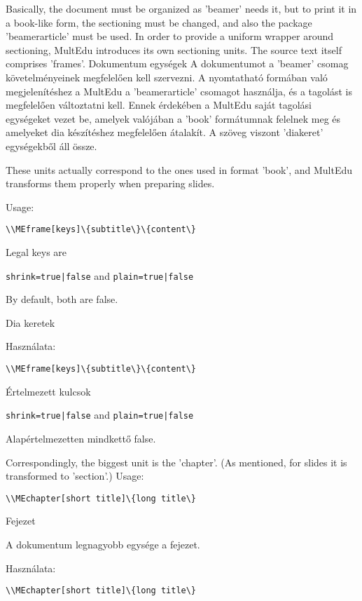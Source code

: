 



{
Basically, the document must be organized as 'beamer' needs it,
but to print it in a book-like form, the sectioning must be changed,
and also the package 'beamerarticle' must be used.
In order to provide a uniform wrapper around sectioning, \gls{MultEdu} introduces
its own sectioning units. The source text itself comprises 'frames'.
}
{Dokumentum egységek}
{
A dokumentumot a 'beamer' csomag követelményeinek megfelelően kell szervezni.
A nyomtatható formában való megjelenítéshez a \gls{MultEdu}  a 'beamerarticle' csomagot használja,
és a tagolást is megfelelően változtatni kell.
Ennek érdekében a \gls{MultEdu} saját tagolási egységeket vezet be, amelyek valójában
a 'book' formátumnak felelnek meg és amelyeket dia készítéshez megfelelően átalakít. A szöveg viszont 'diakeret' egységekből áll össze.
}

{
These units actually correspond to the ones used in format 'book',
and \gls{MultEdu} transforms them properly when preparing slides.

Usage:\par
\noindent\lstinline|\\MEframe[keys]\{subtitle\}\{content\}|

Legal keys are 

\noindent\lstinline!shrink=true|false! and \lstinline!plain=true|false!

By default, both are false.
}
{Dia keretek}
{

Használata:\par
\noindent\lstinline|\\MEframe[keys]\{subtitle\}\{content\}|

Értelmezett kulcsok 

\noindent\lstinline!shrink=true|false! and \lstinline!plain=true|false!

Alapértelmezetten mindkettő false.
}


{
Correspondingly, the biggest unit is the 'chapter'.
(As mentioned, for slides it is transformed to 'section'.)
Usage:\par
\noindent\lstinline|\\MEchapter[short title]\{long title\}|

}
{Fejezet}
{

A dokumentum legnagyobb egysége a fejezet.

Használata:\par
\noindent\lstinline|\\MEchapter[short title]\{long title\}|

}


